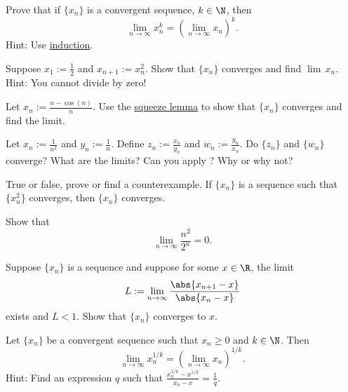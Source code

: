 \documentclass[12pt]{book}
\begin{document}
\begin{exercise}
Prove that if $\{ x_n \}$ is a convergent sequence, $k \in \N$, then
\begin{equation*}
\lim_{n\to\infty} x_n^k = 
{\left( \lim_{n\to\infty} x_n \right)}^k .
\end{equation*}
Hint: Use \hyperref[induction:thm]{induction}.
\end{exercise}

\begin{exercise}
Suppose $x_1 := \frac{1}{2}$ and $x_{n+1} := x_n^2$.
Show that
$\{ x_n \}$ converges and find
$\lim\, x_n$.
Hint: You cannot divide by zero!
\end{exercise}

\begin{exercise}
Let $x_n := \frac{n-\cos(n)}{n}$.
Use the
\hyperref[squeeze:lemma]{squeeze lemma} to show that
$\{ x_n \}$ converges and find the limit.
\end{exercise}

\begin{exercise}
Let $x_n := \frac{1}{n^2}$ and $y_n := \frac{1}{n}$.
Define
$z_n := \frac{x_n}{y_n}$ and 
$w_n := \frac{y_n}{x_n}$.
Do $\{ z_n \}$ and $\{ w_n \}$
converge?
What are the limits?
Can you apply ?
Why or why not?
\end{exercise}

\begin{exercise}
True or false, prove or find a counterexample.
If $\{ x_n \}$ is a sequence
such that $\{ x_n^2 \}$ converges, then $\{ x_n \}$ converges.
\end{exercise}

\begin{exercise}
Show that
\begin{equation*}
\lim_{n\to\infty} \frac{n^2}{2^n} = 0 .
\end{equation*}
\end{exercise}

\begin{exercise}
Suppose $\{ x_n \}$ is a sequence and suppose for
some $x \in \R$, the limit
\begin{equation*}
L := \lim_{n \to \infty} \frac{\abs{x_{n+1}-x}}{\abs{x_n-x}}
\end{equation*}
exists and $L < 1$.
Show that $\{ x_n \}$ converges to $x$.
\end{exercise}

\begin{exercise}[Challenging]
Let $\{ x_n \}$ be a convergent sequence such
that $x_n \geq 0$ and $k \in \N$.
Then
\begin{equation*}
\lim_{n\to\infty} x_n^{1/k} =
{\left( \lim_{n\to\infty} x_n \right)}^{1/k} .
\end{equation*}
Hint: Find an expression $q$ such that $\frac{x_n^{1/k}-x^{1/k}}{x_n-x} =
\frac{1}{q}$.
\end{exercise}
\end{document}
